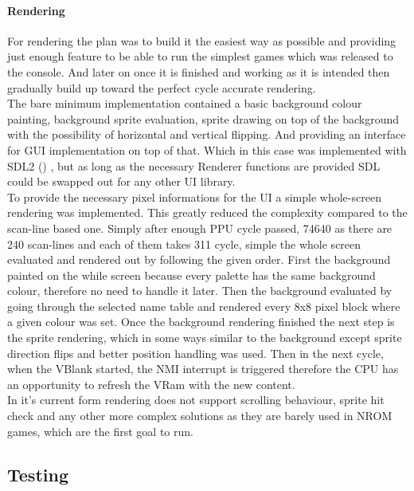 \documentclass[]{report}
\begin{document}
\paragraph{Rendering}
For rendering the plan was to build it the easiest way as possible and providing just enough feature to be able to run the simplest games which was released to the console. And later on once it is finished and working as it is intended then gradually build up toward the perfect cycle accurate rendering.
\\
The bare minimum implementation contained a basic background colour painting, background sprite evaluation, sprite drawing on top of the background with the possibility of horizontal and vertical flipping. And providing an interface for GUI implementation on top of that. Which in this case was implemented with SDL2 (\cite{SDL2}) , but as long as the necessary Renderer functions are provided SDL could be swapped out for any other UI library.
\\
To provide the necessary pixel informations for the UI a simple whole-screen rendering was implemented. This greatly reduced the complexity compared to the scan-line based one. Simply after enough PPU cycle passed, 74640 as there are 240 scan-lines and each of them takes 311 cycle, simple the whole screen evaluated and rendered out by following the given order. First the background painted on the while screen because every palette has the same background colour, therefore no need to handle it later. Then the background evaluated by going through the selected name table and rendered every 8x8 pixel block where a given colour was set. Once the background rendering finished the next step is the sprite rendering, which in some ways similar to the background except sprite direction flips and better position handling was used.
Then in the next cycle, when the VBlank started, the NMI interrupt is triggered therefore the CPU has an opportunity to refresh the VRam with the new content.
\\
In it's current form rendering does not support scrolling behaviour, sprite hit check and any other more complex solutions as they are barely used in NROM games, which are the first goal to run.

\subsection{Testing}
\end{document}
